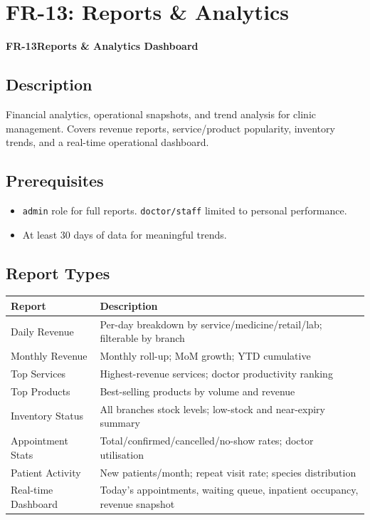 \documentclass[12pt,a4paper]{report}
\newcommand{\moduleheader}[2]{%
  \par\vspace{6pt}%
  \noindent\colorbox{branddark}{\color{white}\textbf{\small #1}}\quad\textbf{\large #2}%
  \par\vspace{4pt}%
}
\begin{document}
\chapter{FR-13: Reports \& Analytics}

\moduleheader{FR-13}{Reports \& Analytics Dashboard}

\section{Description}

Financial analytics, operational snapshots, and trend analysis for clinic management. Covers revenue reports, service/product popularity, inventory trends, and a real-time operational dashboard.

\section{Prerequisites}

\begin{itemize}
  \item \texttt{admin} role for full reports. \texttt{doctor/staff} limited to personal performance.
  \item At least 30 days of data for meaningful trends.
\end{itemize}

\section{Report Types}

\begin{longtable}{L{4cm} L{10cm}}
\toprule
\textbf{Report} & \textbf{Description} \\\midrule\endhead\bottomrule\endfoot
Daily Revenue       & Per-day breakdown by service/medicine/retail/lab; filterable by branch \\
Monthly Revenue     & Monthly roll-up; MoM growth; YTD cumulative \\
Top Services        & Highest-revenue services; doctor productivity ranking \\
Top Products        & Best-selling products by volume and revenue \\
Inventory Status    & All branches stock levels; low-stock and near-expiry summary \\
Appointment Stats   & Total/confirmed/cancelled/no-show rates; doctor utilisation \\
Patient Activity    & New patients/month; repeat visit rate; species distribution \\
Real-time Dashboard & Today's appointments, waiting queue, inpatient occupancy, revenue snapshot \\
\end{longtable}
\end{document}
